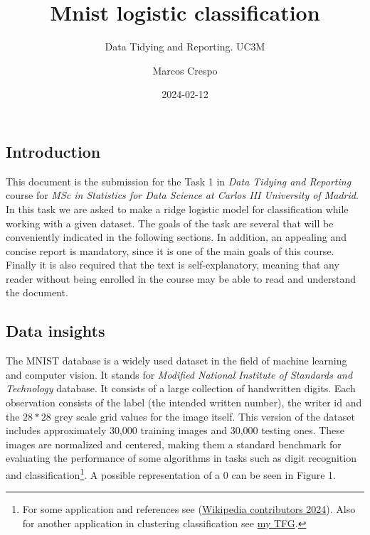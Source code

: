 \documentclass[
  10pt,
]{article}
\title{Mnist logistic classification}
\subtitle{Data Tidying and Reporting. UC3M}
\author{Marcos Crespo}
\date{2024-02-12}
\begin{document}
\maketitle

\hypertarget{introduction}{%
\subsection{Introduction}\label{introduction}}

This document is the submission for the Task 1 in \emph{Data Tidying and
Reporting} course for \emph{MSc in Statistics for Data Science at Carlos
III University of Madrid}. In this task we are asked to make a ridge
logistic model for classification while working with a given dataset.
The goals of the task are several that will be conveniently indicated in
the following sections. In addition, an appealing and concise report is
mandatory, since it is one of the main goals of this course. Finally it
is also required that the text is self-explanatory, meaning that any
reader without being enrolled in the course may be able to read and
understand the document.

\hypertarget{data-insights}{%
\subsection{Data insights}\label{data-insights}}

The MNIST database is a widely used dataset in the field of machine
learning and computer vision. It stands for \emph{Modified National
Institute of Standards and Technology} database. It consists of a large
collection of handwritten digits. Each observation consists of the label
(the intended written number), the writer id and the \(28*28\) grey
scale grid values for the image itself. This version of the dataset
includes approximately 30,000 training images and 30,000 testing ones.
These images are normalized and centered, making them a standard
benchmark for evaluating the performance of some algorithms in tasks
such as digit recognition and classification\footnote{For some
  application and references see
  (\protect\hyperlink{ref-enwiki:1199732782}{Wikipedia contributors
  2024}). Also for another application in clustering classification see
  \href{https://drive.google.com/file/d/10lz-Mb0Otr4FnVMBtQrqzTmlPGbF0smE/view?usp=sharing}{my
  TFG}.}. A possible representation of a \(0\) can be seen in Figure 1.
\end{document}
